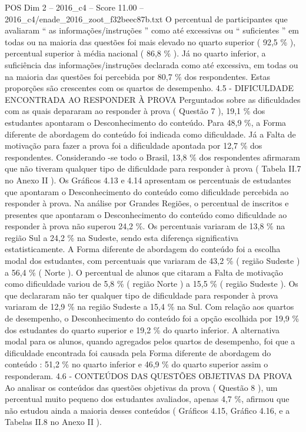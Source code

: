 \begin{textsample}{POS Dim 2 – 2016\_c4 – Score 11.00 – 2016\_c4/enade\_2016\_zoot\_f32beec87b.txt}
O percentual de participantes que avaliaram “ as informações/instruções ” como até excessivas ou “ suficientes ” em todas ou na maioria das questões foi mais elevado no quarto superior ( 92,5 \% ), percentual superior à média nacional ( 86,8 \% ).
Já no quarto inferior, a suficiência das informações/instruções declarada como até excessiva, em todas ou na maioria das questões foi percebida por 80,7 \% dos respondentes.
Estas proporções são crescentes com os quartos de desempenho. 4.5 - DIFICULDADE ENCONTRADA AO RESPONDER À PROVA Perguntados sobre as dificuldades com as quais depararam ao responder à prova ( Questão 7 ), 19,1 \% dos estudantes apontaram o Desconhecimento do conteúdo.
Para 48,9 \%, a Forma diferente de abordagem do conteúdo foi indicada como dificuldade.
Já a Falta de motivação para fazer a prova foi a dificuldade apontada por 12,7 \% dos respondentes.
Considerando -se todo o Brasil, 13,8 \% dos respondentes afirmaram que não tiveram qualquer tipo de dificuldade para responder à prova ( Tabela II.7 no Anexo II ).
Os Gráficos 4.13 e 4.14 apresentam os percentuais de estudantes que apontaram o Desconhecimento do conteúdo como dificuldade percebida ao responder à prova.
Na análise por Grandes Regiões, o percentual de inscritos e presentes que apontaram o Desconhecimento do conteúdo como dificuldade ao responder à prova não superou 24,2 \%.
Os percentuais variaram de 13,8 \% na região Sul a 24,2 \% na Sudeste, sendo esta diferença significativa estatisticamente.
A Forma diferente de abordagem do conteúdo foi a escolha modal dos estudantes, com percentuais que variaram de 43,2 \% ( região Sudeste ) a 56,4 \% ( Norte ).
O percentual de alunos que citaram a Falta de motivação como dificuldade variou de 5,8 \% ( região Norte ) a 15,5 \% ( região Sudeste ).
Os que declararam não ter qualquer tipo de dificuldade para responder à prova variaram de 12,9 \% na região Sudeste a 15,4 \% na Sul.
Com relação aos quartos de desempenho, o Desconhecimento do conteúdo foi a opção escolhida por 19,9 \% dos estudantes do quarto superior e 19,2 \% do quarto inferior.
A alternativa modal para os alunos, quando agregados pelos quartos de desempenho, foi que a dificuldade encontrada foi causada pela Forma diferente de abordagem do conteúdo : 51,2 \% no quarto inferior e 46,9 \% do quarto superior assim o responderam. 4.6 - CONTEÚDOS DAS QUESTÕES OBJETIVAS DA PROVA Ao analisar os conteúdos das questões objetivas da prova ( Questão 8 ), um percentual muito pequeno dos estudantes avaliados, apenas 4,7 \%, afirmou que não estudou ainda a maioria desses conteúdos ( Gráficos 4.15, Gráfico 4.16, e a Tabelas II.8 no Anexo II ).

\end{textsample}
